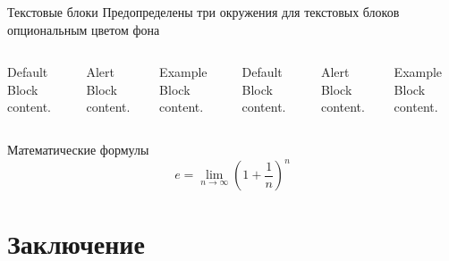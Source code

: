 \documentclass[12pt]{beamer}
\begin{document}
\begin{frame}{Текстовые блоки}
Предопределены три окружения для текстовых блоков  опциональным цветом фона

\begin{columns}[T,onlytextwidth]

\begin{block}{Default}
Block content.
\end{block}

\begin{alertblock}{Alert}
Block content.
\end{alertblock}

\begin{exampleblock}{Example}
Block content.
\end{exampleblock}


\begin{block}{Default}
Block content.
\end{block}

\begin{alertblock}{Alert}
Block content.
\end{alertblock}

\begin{exampleblock}{Example}
Block content.
\end{exampleblock}
\end{columns}
\end{frame}

\begin{frame}{Математические формулы}
  \begin{equation*}
    e = \lim_{n\to \infty} \left(1 + \frac{1}{n}\right)^n
  \end{equation*}
\end{frame}


\section{Заключение}
\end{document}
